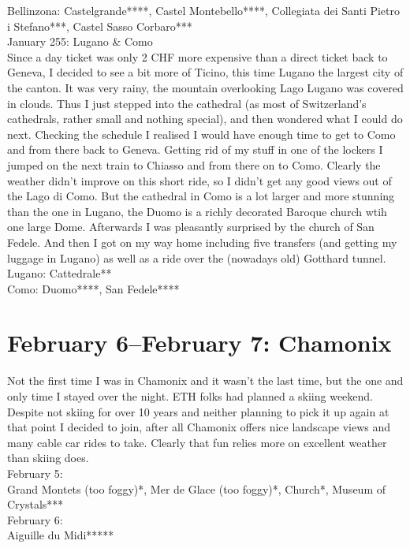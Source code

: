 Bellinzona: Castelgrande****, Castel Montebello****, Collegiata dei Santi Pietro i Stefano***, Castel Sasso Corbaro***\\

January 255: Lugano \& Como\\
Since a day ticket was only 2 CHF more expensive than a direct ticket back to Geneva, I decided to see a bit more of Ticino, this time Lugano the largest city of the canton. It was very rainy, the mountain overlooking Lago Lugano was covered in clouds. Thus I just stepped into the cathedral (as most of Switzerland's cathedrals, rather small and nothing special), and then wondered what I could do next. Checking the schedule I realised I would have enough time to get to Como and from there back to Geneva. Getting rid of my stuff in one of the lockers I jumped on the next train to Chiasso and from there on to Como. Clearly the weather didn't improve on this short ride, so I didn't get any good views out of the Lago di Como. But the cathedral in Como is a lot larger and more stunning than the one in Lugano, the Duomo is a richly decorated Baroque church wtih one large Dome. Afterwards I was pleasantly surprised by the church of San Fedele. And then I got on my way home including five transfers (and getting my luggage in Lugano) as well as a ride over the (nowadays old) Gotthard tunnel.\\

Lugano: Cattedrale**\\
Como: Duomo****, San Fedele****

\section{February 6--February 7: Chamonix}
\label{Chamonix2010}

Not the first time I was in Chamonix and it wasn't the last time, but the one and only time I stayed over the night. ETH folks had planned a skiing weekend. Despite not skiing for over 10 years and neither planning to pick it up again at that point I decided to join, after all Chamonix offers nice landscape views and many cable car rides to take. Clearly that fun relies more on excellent weather than skiing does.\\

February 5:\\
Grand Montets (too foggy)*, Mer de Glace (too foggy)*, Church*, Museum of Crystals***\\

February 6:\\
Aiguille du Midi*****

